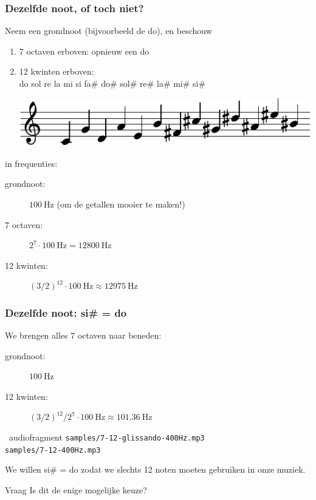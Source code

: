 \documentclass[compress, darktitle, framenumber, totalframenumber]{beamer}
\begin{document}
\begin{frame}
  \frametitle{Dezelfde noot, of toch niet?}

  Neem een grondnoot (bijvoorbeeld de do), en beschouw
  \begin{enumerate}
    \item 7 octaven erboven: opnieuw een do
      \pause
    \item 12 kwinten erboven: \\
      do sol re la mi si fa\# do\# sol\# re\# la\# mi\# si\#

      \includegraphics{scores/circle-cropped}
  \end{enumerate}
  \pause
  in frequenties:
  \begin{description}
    \item[grondnoot:] $\SI{100}{\hertz}$ (om de getallen mooier te maken!)
    \item[7 octaven:] $2^7\cdot\SI{100}{\hertz}=\SI{12800}{\hertz}$ 
      \pause
    \item[12 kwinten:] $(3/2)^{12}\cdot\SI{100}{\hertz}\approx\SI{12975}{\hertz}$
  \end{description}
\end{frame}

\begin{frame}
  \frametitle{Dezelfde noot: si\# = do}

  We brengen alles 7 octaven naar beneden:
  \begin{description}
    \item[grondnoot:] $\SI{100}{\hertz}$
    \item[12 kwinten:] $(3/2)^{12}/2^7\cdot\SI{100}{\hertz}\approx\SI{101.36}{\hertz}$
  \end{description}
  \pause
  \begin{block}{\twonotes\ audiofragment}
    \texttt{samples/7-12-glissando-400Hz.mp3} \\
    \texttt{samples/7-12-400Hz.mp3}
  \end{block}
  \pause
  We willen si\# = do zodat we slechts 12 noten moeten gebruiken in onze muziek.

  \begin{alertblock}{Vraag}
    Is dit de enige mogelijke keuze?
  \end{alertblock}
\end{frame}
\end{document}
